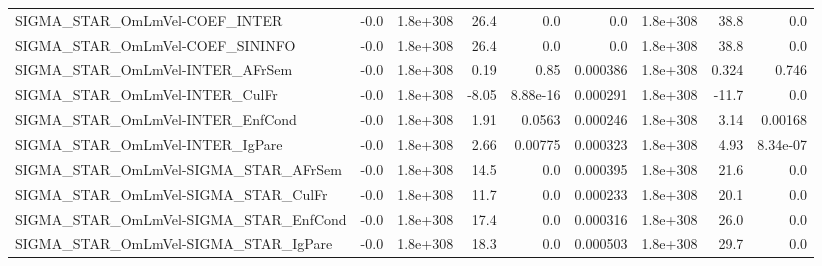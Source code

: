 \begin{tabular}{lrrrrrrrr}
SIGMA\_STAR\_OmLmVel-COEF\_INTER         &        -0.0 &     1.8e+308 &    26.4 &      0.0 &        0.0 &    1.8e+308 &         38.8 &           0.0 \\
SIGMA\_STAR\_OmLmVel-COEF\_SININFO       &        -0.0 &     1.8e+308 &    26.4 &      0.0 &        0.0 &    1.8e+308 &         38.8 &           0.0 \\
SIGMA\_STAR\_OmLmVel-INTER\_AFrSem       &        -0.0 &     1.8e+308 &    0.19 &     0.85 &   0.000386 &    1.8e+308 &        0.324 &         0.746 \\
SIGMA\_STAR\_OmLmVel-INTER\_CulFr        &        -0.0 &     1.8e+308 &   -8.05 & 8.88e-16 &   0.000291 &    1.8e+308 &        -11.7 &           0.0 \\
SIGMA\_STAR\_OmLmVel-INTER\_EnfCond      &        -0.0 &     1.8e+308 &    1.91 &   0.0563 &   0.000246 &    1.8e+308 &         3.14 &       0.00168 \\
SIGMA\_STAR\_OmLmVel-INTER\_IgPare       &        -0.0 &     1.8e+308 &    2.66 &  0.00775 &   0.000323 &    1.8e+308 &         4.93 &      8.34e-07 \\
SIGMA\_STAR\_OmLmVel-SIGMA\_STAR\_AFrSem  &        -0.0 &     1.8e+308 &    14.5 &      0.0 &   0.000395 &    1.8e+308 &         21.6 &           0.0 \\
SIGMA\_STAR\_OmLmVel-SIGMA\_STAR\_CulFr   &        -0.0 &     1.8e+308 &    11.7 &      0.0 &   0.000233 &    1.8e+308 &         20.1 &           0.0 \\
SIGMA\_STAR\_OmLmVel-SIGMA\_STAR\_EnfCond &        -0.0 &     1.8e+308 &    17.4 &      0.0 &   0.000316 &    1.8e+308 &         26.0 &           0.0 \\
SIGMA\_STAR\_OmLmVel-SIGMA\_STAR\_IgPare  &        -0.0 &     1.8e+308 &    18.3 &      0.0 &   0.000503 &    1.8e+308 &         29.7 &           0.0 \\
\bottomrule
\end{tabular}
